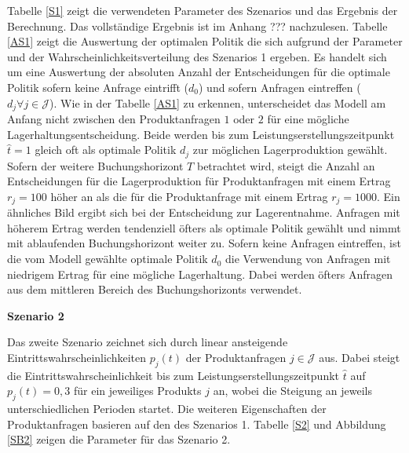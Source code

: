 Tabelle \ref{S1} zeigt die verwendeten Parameter des Szenarios und das Ergebnis der Berechnung. Das vollständige Ergebnis ist im Anhang ??? nachzulesen. Tabelle \ref{AS1} zeigt die Auswertung der optimalen Politik die sich aufgrund der Parameter und der Wahrscheinlichkeitsverteilung des Szenarios 1 ergeben. Es handelt sich um eine Auswertung der absoluten Anzahl der Entscheidungen für die optimale Politik sofern keine Anfrage eintrifft ($d_0$) und sofern Anfragen eintreffen ($d_j\forall j \in\mathcal{J}$). Wie in der Tabelle \ref{AS1} zu erkennen, unterscheidet das Modell am Anfang nicht zwischen den Produktanfragen $1$ oder $2$ für eine mögliche Lagerhaltungsentscheidung. Beide werden bis zum Leistungserstellungszeitpunkt $\hat t=1$ gleich oft als optimale Politik $d_{j}$ zur möglichen Lagerproduktion gewählt. Sofern der weitere Buchungshorizont $T$ betrachtet wird, steigt die Anzahl an Entscheidungen für die Lagerproduktion für Produktanfragen mit einem Ertrag $r_j=100$ höher an als die für die Produktanfrage mit einem Ertrag $r_j=1000$. Ein ähnliches Bild ergibt sich bei der Entscheidung zur Lagerentnahme. Anfragen mit höherem Ertrag werden tendenziell öfters als optimale Politik gewählt und nimmt mit ablaufenden Buchungshorizont weiter zu. Sofern keine Anfragen eintreffen, ist die vom Modell gewählte optimale Politik $d_{0}$ die Verwendung von Anfragen mit niedrigem Ertrag für eine mögliche Lagerhaltung. Dabei werden öfters Anfragen aus dem mittleren Bereich des Buchungshorizonts verwendet.

\textbf{Szenario 2}

Das zweite Szenario zeichnet sich durch linear ansteigende Eintrittswahrscheinlichkeiten $p_j(t)$ der Produktanfragen $j\in\mathcal{J}$ aus. Dabei steigt die Eintrittswahrscheinlichkeit bis zum Leistungserstellungszeitpunkt $\hat t$ auf $p_j(t)=0,3$ für ein jeweiliges Produkts $j$ an, wobei die Steigung an jeweils unterschiedlichen Perioden startet. Die weiteren Eigenschaften der Produktanfragen basieren auf den des Szenarios 1. Tabelle \ref{S2} und Abbildung \ref{SB2} zeigen die Parameter für das Szenario 2.

